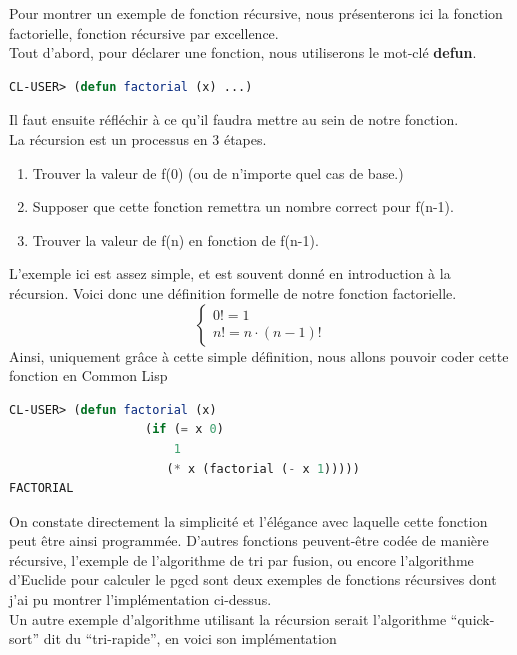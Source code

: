 \documentclass[a4paper, 12pt]{article}
\numberwithin{equation}{subsection}
\begin{document}
Pour montrer un exemple de fonction récursive, nous présenterons ici la fonction factorielle, fonction récursive par excellence. \\

Tout d'abord, pour déclarer une fonction, nous utiliserons le mot-clé {\bf defun}.
\begin{lstlisting}[language=Lisp]
CL-USER> (defun factorial (x) ...)
\end{lstlisting}
Il faut ensuite réfléchir à ce qu'il faudra mettre au sein de notre fonction. \\

La récursion est un processus en 3 étapes. \\
\begin{enumerate}
  \item Trouver la valeur de f(0) (ou de n'importe quel cas de base.)
  \item Supposer que cette fonction remettra un nombre correct pour f(n-1).
  \item Trouver la valeur de f(n) en fonction de f(n-1).
\end{enumerate}
L'exemple ici est assez simple, et est souvent donné en introduction à la récursion. Voici donc une définition formelle de notre fonction factorielle. \\
$$\begin{cases}0! = 1 \\ n! = n \cdot (n - 1)! \end{cases}$$
Ainsi, uniquement grâce à cette simple définition, nous allons pouvoir coder cette fonction en Common Lisp \\
\begin{lstlisting}[language=Lisp]
CL-USER> (defun factorial (x)
                   (if (= x 0)
                       1
                      (* x (factorial (- x 1)))))
FACTORIAL
\end{lstlisting}
On constate directement la simplicité et l'élégance avec laquelle cette fonction peut être ainsi programmée. D'autres fonctions peuvent-être codée de manière récursive, l'exemple de l'algorithme de tri par fusion, ou encore l'algorithme d'Euclide pour calculer le pgcd sont deux exemples de fonctions récursives dont j'ai pu montrer l'implémentation ci-dessus. \\

Un autre exemple d'algorithme utilisant la récursion serait l'algorithme ``quick-sort'' dit du ``tri-rapide'', en voici son implémentation \\
\end{document}
